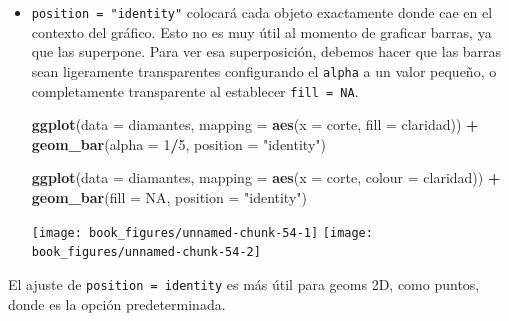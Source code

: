 \documentclass[11pt,oneside]{report}
\newenvironment{Shaded}{\begin{snugshade}}{\end{snugshade}}
\newcommand{\DataTypeTok}[1]{\textcolor[rgb]{0.13,0.29,0.53}{#1}}
\newcommand{\DecValTok}[1]{\textcolor[rgb]{0.00,0.00,0.81}{#1}}
\newcommand{\KeywordTok}[1]{\textcolor[rgb]{0.13,0.29,0.53}{\textbf{#1}}}
\newcommand{\NormalTok}[1]{#1}
\newcommand{\OperatorTok}[1]{\textcolor[rgb]{0.81,0.36,0.00}{\textbf{#1}}}
\newcommand{\OtherTok}[1]{\textcolor[rgb]{0.56,0.35,0.01}{#1}}
\newcommand{\StringTok}[1]{\textcolor[rgb]{0.31,0.60,0.02}{#1}}
\begin{document}
\begin{itemize}
\item
  \texttt{position\ =\ "identity"} colocará cada objeto exactamente
  donde cae en el contexto del gráfico. Esto no es muy útil al momento
  de graficar barras, ya que las superpone. Para ver esa superposición,
  debemos hacer que las barras sean ligeramente transparentes
  configurando el \texttt{alpha} a un valor pequeño, o completamente
  transparente al establecer \texttt{fill\ =\ NA}.

\begin{Shaded}
\begin{Highlighting}[]
\KeywordTok{ggplot}\NormalTok{(}\DataTypeTok{data =}\NormalTok{ diamantes, }\DataTypeTok{mapping =} \KeywordTok{aes}\NormalTok{(}\DataTypeTok{x =}\NormalTok{ corte, }\DataTypeTok{fill =}\NormalTok{ claridad)) }\OperatorTok{+}
\StringTok{  }\KeywordTok{geom_bar}\NormalTok{(}\DataTypeTok{alpha =} \DecValTok{1}\OperatorTok{/}\DecValTok{5}\NormalTok{, }\DataTypeTok{position =} \StringTok{"identity"}\NormalTok{)}

\KeywordTok{ggplot}\NormalTok{(}\DataTypeTok{data =}\NormalTok{ diamantes, }\DataTypeTok{mapping =} \KeywordTok{aes}\NormalTok{(}\DataTypeTok{x =}\NormalTok{ corte, }\DataTypeTok{colour =}\NormalTok{ claridad)) }\OperatorTok{+}
\StringTok{  }\KeywordTok{geom_bar}\NormalTok{(}\DataTypeTok{fill =} \OtherTok{NA}\NormalTok{, }\DataTypeTok{position =} \StringTok{"identity"}\NormalTok{)}
\end{Highlighting}
\end{Shaded}

  \texttt{[image: book\_figures/unnamed-chunk-54-1]}
  \texttt{[image: book\_figures/unnamed-chunk-54-2]}
\end{itemize}

El ajuste de \texttt{position\ =\ identity} es más útil para geoms 2D,
como puntos, donde es la opción predeterminada.
\end{document}
